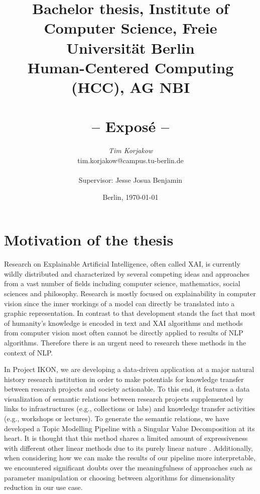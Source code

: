 \documentclass[pdftex,a4paper,12pt]{scrartcl}
\title{
{\small Bachelor thesis, Institute of Computer Science, Freie Universität Berlin}\\
{\small Human-Centered Computing (HCC), AG NBI}\\
[6ex]
{\LARGE<Titel der Arbeit>}\\
{\normalsize-- Exposé --}}
\author{
{\emph{\normalsize Tim Korjakow}}\\
{\normalsize tim.korjakow@campus.tu-berlin.de}\\\\
{\normalsize Supervisor: Jesse Josua Benjamin }
}
\date{\normalsize Berlin, \today}
\newcommand{\blankpage}{
\newpage
\thispagestyle{empty}
\mbox{}
\newpage
}
\begin{document}
\maketitle 

\thispagestyle{empty}  %

\blankpage


\setcounter{page}{1} %

\section{Motivation of the thesis} 

Research on Explainable Artificial Intelligence, often called XAI, is currently wildly distributed and characterized by several competing ideas and approaches from a vast number of fields including computer science, mathematics, social sciences and philosophy. Research is mostly focused on explainability in computer vision since the inner workings of a model can directly be translated into a graphic representation. In contrast to that development stands the fact that most of humanity's knowledge is encoded in text and XAI algorithms and methods from computer vision most often cannot be directly applied to results of NLP algorithms. Therefore there is an urgent need to research these methods in the context of NLP.

In Project IKON, we are developing a data-driven application at a major natural history research institution in order to make potentials for knowledge transfer between research projects and society actionable. To this end, it features a data visualization of semantic relations between research projects supplemented by links to infrastructures (e.g., collections or labs) and knowledge transfer activities (e.g., workshops or lectures). To generate the semantic relations, we have developed a Topic Modelling Pipeline with a Singular Value Decomposition at its heart. It is thought that this method shares a limited amount of expressiveness with different other linear methods due to its purely linear nature \cite{arrasWhatRelevantText2017}. Additionally, when considering how we can make the results of our pipeline more interpretable, we encountered significant doubts over the meaningfulness of approaches such as parameter manipulation or choosing between algorithms for dimensionality reduction \cite{benjaminTransparencyMediationMeaning2018} in our use case.
\end{document}
